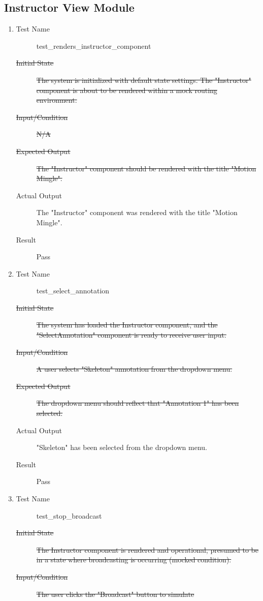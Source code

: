 \documentclass[12pt, titlepage]{article}
\begin{document}
\subsection{Instructor View Module}
\begin{enumerate}[UT-M1]
\item \label{UT-M1}
  \begin{description}
  \item[Test Name] test\_renders\_instructor\_component
  \item[\sout{Initial State}]\sout{ The system is initialized with default state settings.
    The "Instructor" component is about to be rendered within a mock routing
    environment.
  }
		\item[\sout{Input/Condition}]\sout{ N/A
  }
		\item[\sout{Expected Output}]\sout{ The "Instructor" component should be rendered with the
    title "Motion Mingle".
  }
		\item[Actual Output] The "Instructor" component was rendered with the title
    "Motion Mingle".
  \item[Result] Pass
  \end{description}
\item \label{UT-M2}
  \begin{description}
  \item[Test Name] test\_select\_annotation
  \item[\sout{Initial State}]\sout{ The system has loaded the Instructor component, and the
    "SelectAnnotation" component is ready to receive user input.
  }
		\item[\sout{Input/Condition}]\sout{ A user selects "Skeleton" annotation from the dropdown
    menu.
  }
		\item[\sout{Expected Output}]\sout{ The dropdown menu should reflect that "Annotation 1"
    has been selected.
  }
		\item[Actual Output] "Skeleton" has been selected from the dropdown menu.
  \item[Result] Pass
  \end{description}
\item \label{UT-M3}
  \begin{description}
  \item[Test Name] test\_stop\_broadcast
  \item[\sout{Initial State}]\sout{ The Instructor component is rendered and operational,
    presumed to be in a state where broadcasting is occurring (mocked
    condition).
  }
		\item[\sout{Input/Condition}]\sout{ The user clicks the "Broadcast" button to simulate
}
\end{description}
\end{enumerate}
\end{document}
